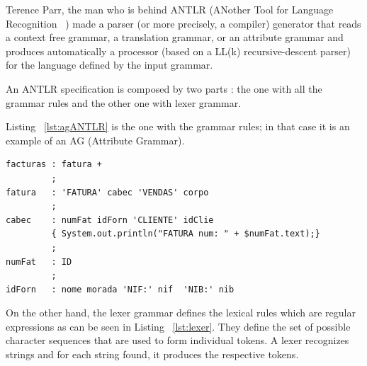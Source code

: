 \documentclass[
  oneside,
  11pt, a4paper,
  footinclude=true,
  headinclude=true,
  cleardoublepage=empty
]{scrbook}
\begin{document}
Terence Parr, the man who is behind ANTLR (ANother Tool for Language Recognition ~\citep{parr2007,Par05}) made a parser (or more precisely, a compiler) generator that reads a context free grammar, a translation grammar, or an attribute grammar and produces automatically a processor (based on a LL(k) recursive-descent parser) for the language defined by the input grammar.

An ANTLR specification is composed by two parts : the one with all the grammar rules and the other one with lexer grammar.

Listing ~\ref{lst:agANTLR} is the one with the grammar rules; in that case it is an  example of an AG (Attribute Grammar).

\begin{lstlisting}[caption={AG representation on ANTLR},label={lst:agANTLR}]
facturas : fatura +
         ;
fatura   : 'FATURA' cabec 'VENDAS' corpo
         ;
cabec    : numFat idForn 'CLIENTE' idClie
         { System.out.println("FATURA num: " + $numFat.text);}
         ;
numFat   : ID
         ;
idForn   : nome morada 'NIF:' nif  'NIB:' nib
\end{lstlisting}


On the other hand, the lexer grammar defines the lexical rules which are regular expressions as can be seen in Listing ~\ref{lst:lexer}. They define the set of possible character sequences that are used to form individual tokens. A lexer recognizes strings and for each string found, it produces the respective tokens. %

\end{document}
